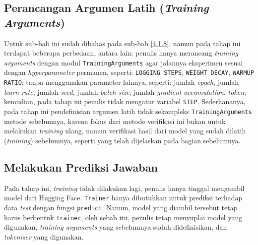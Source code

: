 \subsection{Perancangan Argumen Latih (\emph{Training Arguments})}
\label{4.4.8}
Untuk sub-bab ini sudah dibahas pada sub-bab \ref{4.1.8}, namun pada tahap ini terdapat beberapa perbedaan, antara lain: penulis hanya merancang \emph{training arguments} dengan modul \texttt{TrainingArguments} agar jalannya eksperimen sesuai dengan \emph{hyperparameter} permanen, seperti: \texttt{LOGGING STEPS}, \texttt{WEIGHT DECAY}, \texttt{WARMUP RATIO}; tanpa menggunakan parameter lainnya, seperti: jumlah \emph{epoch}, jumlah \emph{learn rate}, jumlah \emph{seed}, jumlah \emph{batch size}, jumlah \emph{gradient accumulation}, \emph{token}; kemudian, pada tahap ini penulis tidak mengatur variabel \texttt{STEP}. Sederhananya, pada tahap ini pendefinisian argumen latih tidak sekompleks \texttt{TrainingArguments} metode sebelumnya, karena fokus dari metode verifikasi ini bukan untuk melakukan \emph{training} ulang, namun verifikasi hasil dari model yang sudah dilatih (\emph{training}) sebelumnya, seperti yang telah dijelaskan pada bagian sebelumnya.

\subsection{Melakukan Prediksi Jawaban}
\label{4.4.9}
Pada tahap ini, \emph{training} tidak dilakukan lagi, penulis hanya tinggal mengambil model dari Hugging Face. \texttt{Trainer} hanya dibutuhkan untuk prediksi terhadap data \emph{test} dengan fungsi \texttt{predict}. Namun, model yang diambil tersebut tetap harus berbentuk \texttt{Trainer}, oleh sebab itu, penulis tetap menyuplai model yang digunakan, \emph{training arguments} yang sebelumnya sudah didefinisikan, dan \emph{tokenizer} yang digunakan.


